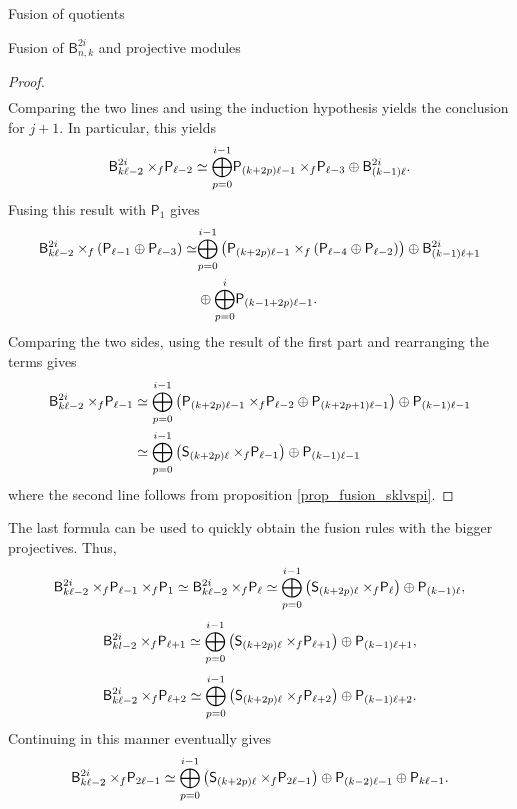 \documentclass[reqno]{amsart}
\newcommand{\ds}[1]{\mathsf S_{#1}}
\newcommand{\dP}[1]{\mathsf P_{#1}}
\newcommand{\xf}{\times\hspace{-0.27em}_f}
\newcommand{\B}[2]{\mathsf{B}^{#1}_{#2}}
\newcommand{\lc}{\ell}
\begin{document}
\begin{section}{Fusion of quotients}
\begin{subsection}{Fusion of $\B{2i}{n,k}$ and projective modules}
\begin{proof}
\begin{align}
\end{align}
Comparing the two lines and using the induction hypothesis yields the conclusion for $j+1$. In particular, this yields
\begin{equation}
	\B{2i}{k\lc -2} \xf \dP{\lc-2} \simeq \overset{i-1}{\underset{p = 0}{\bigoplus}}\dP{(k+2p)\lc-1} \xf \dP{\lc-3} \oplus \B{2i}{(k-1)\lc}.
\end{equation}
Fusing this result with $\dP{1}$ gives
\begin{align}
\B{2i}{k\lc -2} \xf \left(\dP{\lc-1}\oplus \dP{\lc-3}\right) \simeq & \overset{i-1}{\underset{p = 0}{\bigoplus}}\left(\dP{(k+2p)\lc-1} \xf \left(\dP{\lc-4}\oplus \dP{\lc-2}\right)\right) \oplus \B{2i}{(k-1)\lc+1}\\ 
& \oplus \overset{i}{\underset{p = 0}{\bigoplus}}\dP{(k-1+2p)\lc-1}.
\end{align}
Comparing the two sides, using the result of the first part and rearranging the terms gives
\begin{align}
\B{2i}{k\lc -2} \xf  \dP{\lc-1}  & \simeq \overset{i-1}{\underset{p = 0}{\bigoplus}}\left(\dP{(k+2p)\lc-1} \xf \dP{\lc-2} \oplus \dP{(k+2p +1)\lc-1}\right) \oplus \dP{(k-1)\lc-1}\\
&\simeq \overset{i-1}{\underset{p = 0}{\bigoplus}}\left(\ds{(k+2p)\lc} \xf \dP{\lc-1}\right) \oplus \dP{(k-1)\lc-1}
\end{align}
where the second line follows from proposition \ref{prop_fusion_sklvspi}.
\end{proof}
The last formula can be used to quickly obtain the fusion rules with the bigger projectives. Thus,
\begin{equation*}
	\B{2i}{k\lc -2} \xf \dP{\lc-1}\xf \dP{1} \simeq \B{2i}{k\lc-2}\xf \dP{\lc} \simeq \overset{i-1}{\underset{p = 0}{\bigoplus}}\left(\ds{(k+2p)\lc} \xf \dP{\lc}\right) \oplus \dP{(k-1)\lc},
\end{equation*}
\begin{equation*}
	\B{2i}{kl -2} \xf \dP{\lc+1} \simeq \overset{i-1}{\underset{p = 0}{\bigoplus}}\left(\ds{(k+2p)\lc} \xf \dP{\lc+1}\right) \oplus \dP{(k-1)\lc+1},
\end{equation*}
\begin{equation*}
	\B{2i}{k\lc -2} \xf \dP{\lc+2} \simeq \overset{i-1}{\underset{p = 0}{\bigoplus}}\left(\ds{(k+2p)\lc} \xf \dP{\lc+2}\right) \oplus \dP{(k-1)\lc+2}.
\end{equation*}
Continuing in this manner eventually gives
\begin{equation*}
	\B{2i}{k\lc -2} \xf \dP{2\lc-1} \simeq \overset{i-1}{\underset{p = 0}{\bigoplus}}\left(\ds{(k+2p)\lc} \xf \dP{2\lc-1}\right) \oplus \dP{(k-2)\lc-1} \oplus \dP{k \lc -1}.

\end{equation*}
\end{subsection}
\end{section}
\end{document}
